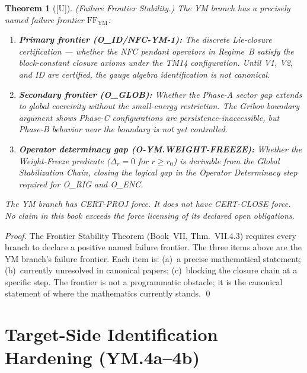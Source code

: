 \documentclass[12pt,oneside]{amsbook}
\theoremstyle{plain}
\newtheorem{theorem}{Theorem}[section]
\theoremstyle{definition}
\theoremstyle{remark}
\newcommand{\status}[1]{\textup{[#1]}}
\begin{document}
\begin{theorem}[\status{U}]\label{thm:YM-frontier}
\textup{(Failure Frontier Stability.)} The YM branch has a
precisely named failure frontier $\mathrm{FF}_{\mathrm{YM}}$:
\begin{enumerate}[label=\textup{(\roman*)}]
 \item \textbf{Primary frontier (O\_ID/NFC-YM-1):}
 The discrete Lie-closure certification --- whether the
 NFC pendant operators in Regime~B satisfy the
 block-constant closure axioms under the TM14 configuration.
 Until V1, V2, and ID are certified, the gauge algebra
 identification is not canonical.
 \item \textbf{Secondary frontier (O\_GLOB):}
 Whether the Phase-A sector gap extends to global
 coercivity without the small-energy restriction. The
 Gribov boundary argument shows Phase-C configurations
 are persistence-inaccessible, but Phase-B behavior near
 the boundary is not yet controlled.
 \item \textbf{Operator determinacy gap (O-YM.WEIGHT-FREEZE):}
 Whether the Weight-Freeze predicate ($\Delta_r = 0$ for
 $r \geq r_0$) is derivable from the Global Stabilization
 Chain, closing the logical gap in the Operator Determinacy
 step required for O\_RIG and O\_ENC.
\end{enumerate}
The YM branch has CERT-PROJ force. It does not have CERT-CLOSE
force. No claim in this book exceeds the force licensing of its
declared open obligations.
\end{theorem}

\begin{proof}
The Frontier Stability Theorem (Book~VII, Thm.~VII.4.3) requires
every branch to declare a positive named failure frontier. The
three items above are the YM branch's failure frontier. Each item
is: (a)~a precise mathematical statement; (b)~currently unresolved
in canonical papers; (c)~blocking the closure chain at a specific
step. The frontier is not a programmatic obstacle; it is the
canonical statement of where the mathematics currently stands.
\qed
\end{proof}

\section{Target-Side Identification Hardening (YM.4a--4b)}
\label{sec:YM-id-hardening}
\end{document}
